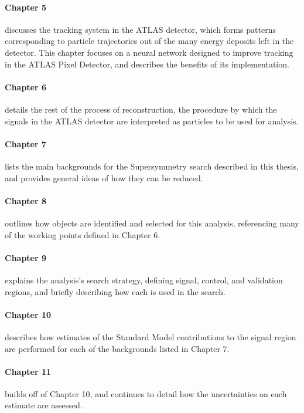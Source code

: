\paragraph{Chapter 5} discusses the tracking system in the \ac{ATLAS} detector, which forms patterns corresponding to particle trajectories out of the many energy deposits left in the detector. This chapter focuses on a neural network designed to improve tracking in the \ac{ATLAS} Pixel Detector, and describes the benefits of its implementation. 

\paragraph{Chapter 6} details the rest of the process of reconstruction, the procedure by which the signals in the \ac{ATLAS} detector are interpreted as particles to be used for analysis. 

\paragraph{Chapter 7} lists the main backgrounds for the Supersymmetry search described in this thesis, and provides general ideas of how they can be reduced. 

\paragraph{Chapter 8} outlines how objects are identified and selected for this analysis, referencing many of the working points defined in Chapter 6.  

\paragraph{Chapter 9} explains the analysis's search strategy, defining signal, control, and validation regions, and briefly describing how each is used in the search.

\paragraph{Chapter 10} describes how estimates of the Standard Model contributions to the signal region are performed for each of the backgrounds listed in Chapter 7. 

\paragraph{Chapter 11} builds off of Chapter 10, and continues to detail how the uncertainties on each estimate are assessed. 

